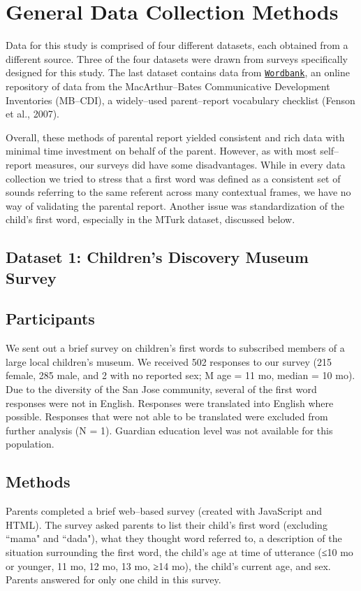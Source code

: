 \documentclass[10pt,letterpaper]{article}
\begin{document}
\section{General Data Collection Methods}
Data for this study is comprised of four different datasets, each obtained from a different source. Three of the four datasets were drawn from surveys specifically designed for this study. The last dataset contains data from \href{http://wordbank.stanford.edu}{\tt{Wordbank}}, an online repository of data from the MacArthur--Bates Communicative Development Inventories (MB--CDI), a widely--used parent--report vocabulary checklist (Fenson et al., 2007).

Overall, these methods of parental report yielded consistent and rich data with minimal time investment on behalf of the parent. However, as with most self--report measures, our surveys did have some disadvantages. While in every data collection we tried to stress that a first word was defined as a consistent set of sounds referring to the same referent across many contextual frames, we have no way of validating the parental report. Another issue was standardization of the child's first word, especially in the MTurk dataset, discussed below. 

\subsection{Dataset 1: Children's Discovery Museum Survey}

\subsection{Participants}
We sent out a brief survey on children's first words to subscribed members of a large local children's museum. We received 502 responses to our survey (215 female, 285 male, and 2 with no reported sex; M age = 11 mo, median = 10 mo). Due to the diversity of the San Jose community, several of the first word responses were not in English. Responses were translated into English where possible. Responses that were not able to be translated were excluded from further analysis (N = 1). Guardian education level was not available for this population.

\subsection{Methods}
Parents completed a brief web--based survey (created with JavaScript and HTML). The survey asked parents to list their child's first word (excluding ``mama" and ``dada"), what they thought word referred to, a description of the situation surrounding the first word, the child's age at time of utterance (≤10 mo or younger, 11 mo, 12 mo, 13 mo, ≥14 mo), the child's current age, and sex. Parents answered for only one child in this survey.
\end{document}
